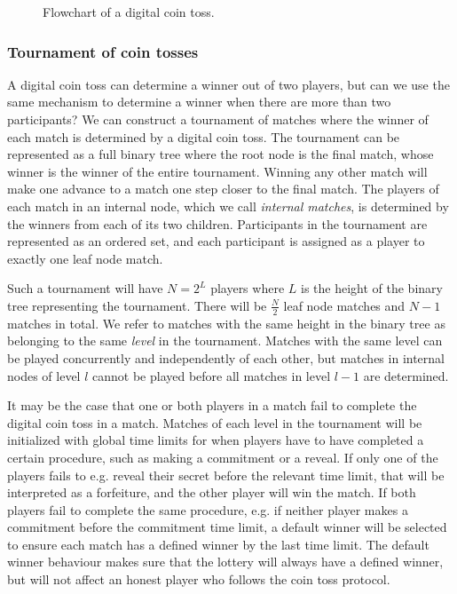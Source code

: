 \begin{figure}[htbp]
  \centering
  
  \caption{Flowchart of a digital coin toss.}
  \label{fig:digital-coin-toss-flow}
\end{figure}

\subsubsection{Tournament of coin tosses}
A digital coin toss can determine a winner out of two players, but can we use the same mechanism to determine a winner when there are more than two participants? We can construct a tournament of matches where the winner of each match is determined by a digital coin toss. The tournament can be represented as a full binary tree where the root node is the final match, whose winner is the winner of the entire tournament. Winning any other match will make one advance to a match one step closer to the final match. The players of each match in an internal node, which we call \emph{internal matches}, is determined by the winners from each of its two children. Participants in the tournament are represented as an ordered set, and each participant is assigned as a player to exactly one leaf node match. 

Such a tournament will have $N=2^L$ players where $L$ is the height of the binary tree representing the tournament. There will be $\frac{N}{2}$ leaf node matches and $N-1$ matches in total. We refer to matches with the same height in the binary tree as belonging to the same \emph{level} in the tournament. Matches with the same level can be played concurrently and independently of each other, but matches in internal nodes of level $l$ cannot be played before all matches in level $l-1$ are determined.

It may be the case that one or both players in a match fail to complete the digital coin toss in a match. Matches of each level in the tournament will be initialized with global time limits for when players have to have completed a certain procedure, such as making a commitment or a reveal. If only one of the players fails to e.g. reveal their secret before the relevant time limit, that will be interpreted as a forfeiture, and the other player will win the match. If both players fail to complete the same procedure, e.g. if neither player makes a commitment before the commitment time limit, a default winner will be selected to ensure each match has a defined winner by the last time limit. The default winner behaviour makes sure that the lottery will always have a defined winner, but will not affect an honest player who follows the coin toss protocol.

